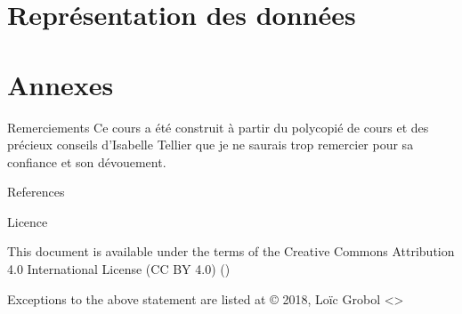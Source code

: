 \documentclass[hyperref={unicode}, xcolor={svgnames}, french]{beamer}
\begin{document}
\section{Représentation des données}


\appendix
{}  %
\section{Annexes}
\begin{frame}{Remerciements}
    Ce cours a été construit à partir du polycopié de cours  \parencite{tellier2017fouille} et des précieux conseils d'Isabelle Tellier que je ne saurais trop remercier pour sa confiance et son dévouement.
\end{frame}

\begin{frame}[allowframebreaks]{References}
    \printbibliography[heading=none]
\end{frame}

\begin{frame}{Licence}
    \begin{center}
        {\huge \ccby}
        \vfill
        This document is available under the terms of the Creative Commons Attribution 4.0 International License (CC BY 4.0) ()

        Exceptions to the above statement are listed at {\small{}}
        \vfill
        © 2018, Loïc Grobol <>

    \end{center}
\end{frame}
\end{document}
